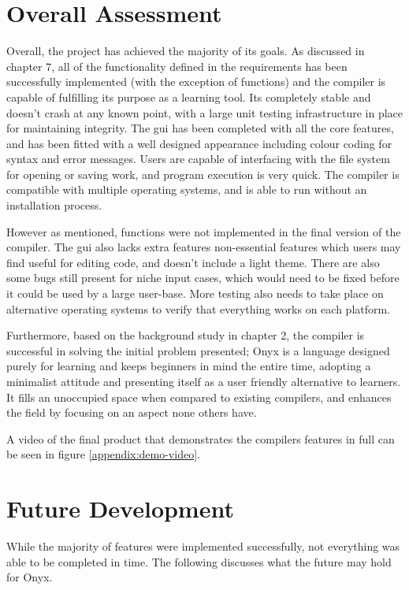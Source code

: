 \documentclass[
]{report}
\begin{document}
\section{Overall Assessment}
Overall, the project has achieved the majority of its goals. As
discussed in chapter 7, all of the functionality defined in the
requirements has been successfully implemented (with the exception of
functions) and the compiler is capable of fulfilling its purpose as a
learning tool. Its completely stable and doesn't crash at any known
point, with a large unit testing infrastructure in place for maintaining
integrity. The \acrshort{gui} has been completed with all the core features, and
has been fitted with a well designed appearance including colour coding
for syntax and error messages. Users are capable of interfacing with the
file system for opening or saving work, and program execution is very
quick. The compiler is compatible with multiple operating systems, and
is able to run without an installation process.

However as mentioned, functions were not implemented in the final
version of the compiler. The \acrshort{gui} also lacks extra features non-essential
features which users may find useful for editing code, and doesn't
include a light theme. There are also some bugs still present for niche
input cases, which would need to be fixed before it could be used by a
large user-base. More testing also needs to take place on alternative
operating systems to verify that everything works on each platform.

Furthermore, based on the background study in chapter 2, the compiler is
successful in solving the initial problem presented; Onyx is a language
designed purely for learning and keeps beginners in mind the entire
time, adopting a minimalist attitude and presenting itself as a user
friendly alternative to learners. It fills an unoccupied space when
compared to existing compilers, and enhances the field by focusing on an
aspect none others have.

A video of the final product that demonstrates the compilers features
in full can be seen in figure \ref{appendix:demo-video}.

\section{Future Development}
While the majority of features were implemented successfully, not
everything was able to be completed in time. The following discusses
what the future may hold for Onyx.
\end{document}
